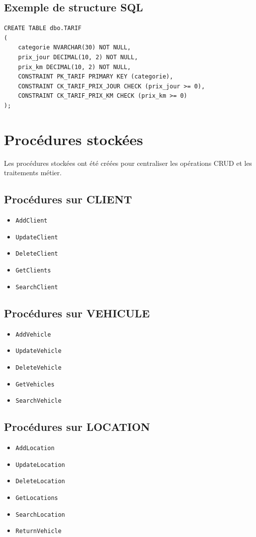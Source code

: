 \documentclass[12pt,a4paper]{report}
\begin{document}
\section{Exemple de structure SQL}
\begin{lstlisting}[language=SQLCustom,caption={Exemple de table TARIF}]
CREATE TABLE dbo.TARIF
(
    categorie NVARCHAR(30) NOT NULL,
    prix_jour DECIMAL(10, 2) NOT NULL,
    prix_km DECIMAL(10, 2) NOT NULL,
    CONSTRAINT PK_TARIF PRIMARY KEY (categorie),
    CONSTRAINT CK_TARIF_PRIX_JOUR CHECK (prix_jour >= 0),
    CONSTRAINT CK_TARIF_PRIX_KM CHECK (prix_km >= 0)
);
\end{lstlisting}

\chapter{Procédures stockées}
Les procédures stockées ont été créées pour centraliser les opérations CRUD et les traitements métier.

\section{Procédures sur CLIENT}
\begin{itemize}[leftmargin=1.2cm]
    \item \texttt{AddClient}
    \item \texttt{UpdateClient}
    \item \texttt{DeleteClient}
    \item \texttt{GetClients}
    \item \texttt{SearchClient}
\end{itemize}

\section{Procédures sur VEHICULE}
\begin{itemize}[leftmargin=1.2cm]
    \item \texttt{AddVehicle}
    \item \texttt{UpdateVehicle}
    \item \texttt{DeleteVehicle}
    \item \texttt{GetVehicles}
    \item \texttt{SearchVehicle}
\end{itemize}

\section{Procédures sur LOCATION}
\begin{itemize}[leftmargin=1.2cm]
    \item \texttt{AddLocation}
    \item \texttt{UpdateLocation}
    \item \texttt{DeleteLocation}
    \item \texttt{GetLocations}
    \item \texttt{SearchLocation}
    \item \texttt{ReturnVehicle}
\end{itemize}
\end{document}
